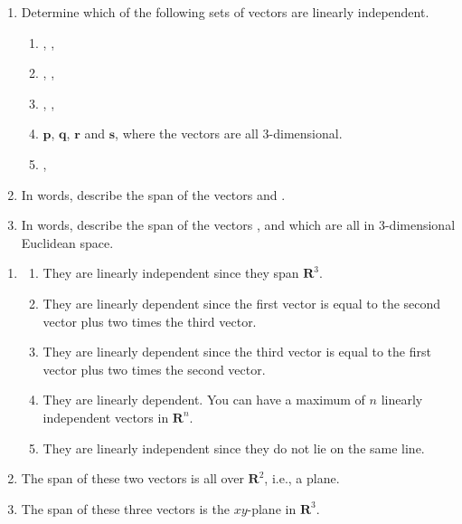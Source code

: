 \begin{prob}
\begin{enumerate}
    \item Determine which of the following sets of vectors are linearly independent.
\begin{enumerate}
\item {},  ,  
\item {},  ,  
\item {},  ,  
\item $\mathbf{p}$, $\mathbf{q}$, $\mathbf{r}$ and $\mathbf{s}$, where the vectors are all 3-dimensional. 
\item {}, 
\end{enumerate}
\item In words, describe the span of the vectors  and .
\item In words, describe the span of the vectors ,  and  which are all in 3-dimensional Euclidean space. 
\end{enumerate}
\end{prob}
\begin{sol}
\begin{enumerate}
	\item \begin{enumerate}
		\item They are linearly independent since they span $\mathbf{R}^3$.
		\item They are linearly dependent since the first vector is equal to the second vector plus two times the third vector.
		\item They are linearly dependent since the third vector is equal to the first vector plus two times the second vector.
		\item They are linearly dependent. You can have a maximum of $n$ linearly independent vectors in $\mathbf{R}^n$.
		\item They are linearly independent since they do not lie on the same line.
	\end{enumerate}
	\item The span of these two vectors is all over $\mathbf{R}^2$, i.e., a plane.
	\item The span of these three vectors is the $xy$-plane in $\mathbf{R}^3$.
\end{enumerate}
\end{sol}

